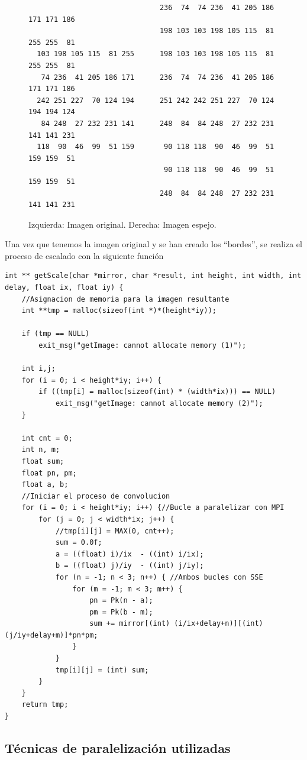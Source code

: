 \documentclass{article}
\begin{document}
\begin{figure}[h]
\centering
\begin{lstlisting}
                               236  74  74 236  41 205 186 171 171 186
                               198 103 103 198 105 115  81 255 255  81 
  103 198 105 115  81 255      198 103 103 198 105 115  81 255 255  81   
   74 236  41 205 186 171      236  74  74 236  41 205 186 171 171 186
  242 251 227  70 124 194      251 242 242 251 227  70 124 194 194 124
   84 248  27 232 231 141      248  84  84 248  27 232 231 141 141 231
  118  90  46  99  51 159       90 118 118  90  46  99  51 159 159  51 
                                90 118 118  90  46  99  51 159 159  51
                               248  84  84 248  27 232 231 141 141 231	
\end{lstlisting}
\caption{Izquierda: Imagen original. Derecha: Imagen espejo.}
\label{fig:ejemploMatrices}
\end{figure}

Una vez que tenemos la imagen original y se han creado los ``bordes'', se realiza el proceso de escalado con la siguiente función

\begin{lstlisting}[style=C]
int ** getScale(char *mirror, char *result, int height, int width, int delay, float ix, float iy) {
	//Asignacion de memoria para la imagen resultante
	int **tmp = malloc(sizeof(int *)*(height*iy));
	
	if (tmp == NULL)
		exit_msg("getImage: cannot allocate memory (1)");
	
	int i,j;
	for (i = 0; i < height*iy; i++) {
		if ((tmp[i] = malloc(sizeof(int) * (width*ix))) == NULL)
			exit_msg("getImage: cannot allocate memory (2)");
	}

	int cnt = 0;
	int n, m;
	float sum;
	float pn, pm;
	float a, b;
	//Iniciar el proceso de convolucion
	for (i = 0; i < height*iy; i++) {//Bucle a paralelizar con MPI
		for (j = 0; j < width*ix; j++) {
			//tmp[i][j] = MAX(0, cnt++);
			sum = 0.0f;
			a = ((float) i)/ix  - ((int) i/ix);
			b = ((float) j)/iy  - ((int) j/iy);
			for (n = -1; n < 3; n++) { //Ambos bucles con SSE
				for (m = -1; m < 3; m++) {
					pn = Pk(n - a);
					pm = Pk(b - m);
					sum += mirror[(int) (i/ix+delay+n)][(int) (j/iy+delay+m)]*pn*pm;
				}
			}
			tmp[i][j] = (int) sum;	
		}
	}
	return tmp;
}
\end{lstlisting}

\subsection{Técnicas de paralelización utilizadas}
\end{document}
